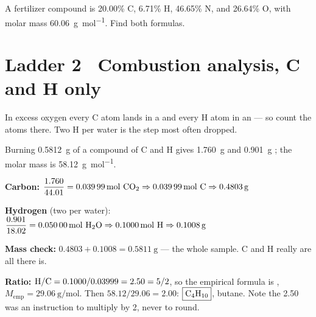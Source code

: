 \documentclass{apchem-worksheet}
\begin{document}
\begin{yourturn}
A fertilizer compound is 20.00\% C, 6.71\% H, 46.65\% N, and 26.64\% O,
with molar mass \SI{60.06}{\gram\per\mole}. Find both formulas.
\workspace[3.6cm]
\end{yourturn}

\section*{\sffamily Ladder 2 \textbullet\ Combustion analysis, C and H
only}

In excess oxygen every C atom lands in a  and every H atom in an
 --- so count the atoms there. Two H per water is the step most
often dropped.

\begin{workedexample}
Burning \SI{0.5812}{\gram} of a compound of C and H gives
\SI{1.760}{\gram}  and \SI{0.901}{\gram} ; the molar mass
is \SI{58.12}{\gram\per\mole}.

\textbf{Carbon:}
$\dfrac{1.760}{44.01} = \SI{0.03999}{\mole}~\ce{CO2} \Rightarrow
\SI{0.03999}{\mole}~\ce{C} \Rightarrow \SI{0.4803}{\gram}$

\textbf{Hydrogen} (two per water):
$\dfrac{0.901}{18.02} = \SI{0.05000}{\mole}~\ce{H2O} \Rightarrow
\SI{0.1000}{\mole}~\ce{H} \Rightarrow \SI{0.1008}{\gram}$

\textbf{Mass check:} $0.4803 + 0.1008 = \SI{0.5811}{\gram}$ --- the whole
sample. C and H really are all there is.

\textbf{Ratio:} $\ce{H}/\ce{C} = 0.1000/0.03999 = 2.50 = 5/2$, so the
empirical formula is , $M_{\text{emp}} = \SI{29.06}{\gram\per\mole}$.
Then $58.12/29.06 = 2.00$: $\boxed{\ce{C4H10}}$, butane. Note the 2.50 was
an instruction to multiply by 2, never to round.
\end{workedexample}
\end{document}
